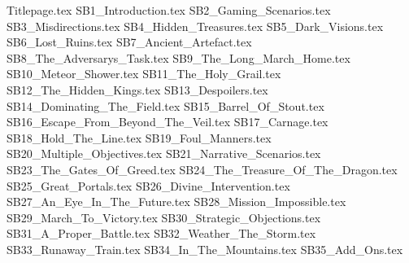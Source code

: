 \documentclass[a4paper,10pt]{article}
\begin{document}
{Titlepage.tex}
\clearpage
{SB1_Introduction.tex}
\clearpage
{SB2_Gaming_Scenarios.tex}
\clearpage
{SB3_Misdirections.tex}
\clearpage
{SB4_Hidden_Treasures.tex}
\clearpage
{SB5_Dark_Visions.tex}
\clearpage
{SB6_Lost_Ruins.tex}
\clearpage
{SB7_Ancient_Artefact.tex}
\clearpage
{SB8_The_Adversarys_Task.tex}
\clearpage
{SB9_The_Long_March_Home.tex}
\clearpage
{SB10_Meteor_Shower.tex}
\clearpage
{SB11_The_Holy_Grail.tex}
\clearpage
{SB12_The_Hidden_Kings.tex}
\clearpage
{SB13_Despoilers.tex}
\clearpage
{SB14_Dominating_The_Field.tex}
\clearpage
{SB15_Barrel_Of_Stout.tex}
\clearpage
{SB16_Escape_From_Beyond_The_Veil.tex}
\clearpage
{SB17_Carnage.tex}
\clearpage
{SB18_Hold_The_Line.tex}
\clearpage
{SB19_Foul_Manners.tex}
\clearpage
{SB20_Multiple_Objectives.tex}
\clearpage
{SB21_Narrative_Scenarios.tex}
\clearpage
{SB23_The_Gates_Of_Greed.tex}
\clearpage
{SB24_The_Treasure_Of_The_Dragon.tex}
\clearpage
{SB25_Great_Portals.tex}
\clearpage
{SB26_Divine_Intervention.tex}
\clearpage
{SB27_An_Eye_In_The_Future.tex}
\clearpage
{SB28_Mission_Impossible.tex}
\clearpage
{SB29_March_To_Victory.tex}
\clearpage
{SB30_Strategic_Objections.tex}
\clearpage
{SB31_A_Proper_Battle.tex}
\clearpage
{SB32_Weather_The_Storm.tex}
\clearpage
{SB33_Runaway_Train.tex}
\clearpage
{SB34_In_The_Mountains.tex}
\clearpage
{SB35_Add_Ons.tex}
\end{document}
